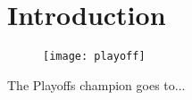 \section{Introduction}


\begin{figure}[h]
\centering
\texttt{[image: playoff]}
\end{figure}

\par The Playoffs champion goes to...


